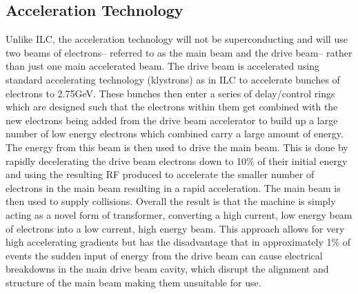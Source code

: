 \subsection{Acceleration Technology}
Unlike \ac{ILC}, the acceleration technology will not be superconducting and will use two beams of electrons-- referred to as the main beam and the drive beam-- rather than just one main accelerated beam. The drive beam is accelerated using standard accelerating technology (klystrons) as in \ac{ILC} to accelerate bunches of electrons to 2.75GeV. These bunches then enter a series of delay/control rings which are designed such that the electrons within them get combined with the new electrons being added from the drive beam accelerator to build up a large number of low energy electrons which combined carry a large amount of energy. The energy from this beam is then used to drive the main beam. This is done by rapidly decelerating the drive beam electrons down to 10\% of their initial energy and using the resulting \ac{RF} produced to accelerate the smaller number of electrons in the main beam resulting in a rapid acceleration. The main beam is then used to supply collisions. Overall the result is that the machine is simply acting as a novel form of transformer, converting a high current, low energy beam of electrons into a low current, high energy beam. This approach allows for very high accelerating gradients but has the disadvantage that in approximately 1\% of events the sudden input of energy from the drive beam can cause electrical breakdowns in the main drive beam cavity, which disrupt the alignment and structure of the main beam making them unsuitable for use.


